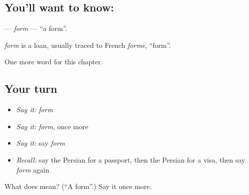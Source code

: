 \subsection*{You'll want to know: }
\textbf{} — \emph{form} — \textquotedblleft{}a form\textquotedblright{}.

\begin{cousinweb}
\emph{form} is a loan, usually traced to French \emph{forme}, \textquotedblleft{}form\textquotedblright{}.
\end{cousinweb}

\begin{grammarlens}[title={What you've built}]
One more word for this chapter.
\end{grammarlens}

\subsection*{Your turn}
\begin{itemize}
\raggedright
  \item \emph{Say it:} \emph{form}
  \item \emph{Say it:} \emph{form}, once more
  \item \emph{Say it:} say \emph{form}
  \item \emph{Recall:} say the Persian for a passport, then the Persian for a visa, then say \emph{form} again
\end{itemize}

\begin{tcolorbox}[breakable,colback=teal!4,colframe=teal!35!black,title={Before you move on}]
What does  mean? (\textquotedblleft{}A form\textquotedblright{}.) Say it once more.
\end{tcolorbox}
